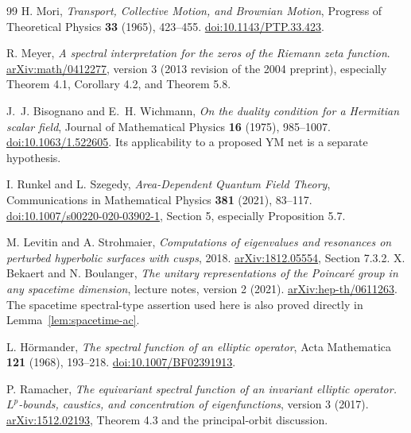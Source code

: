 \begin{thebibliography}{99}
H. Mori, \emph{Transport, Collective Motion, and Brownian
Motion}, Progress of Theoretical Physics \textbf{33}
(1965), 423--455.
\href{https://doi.org/10.1143/PTP.33.423}{doi:10.1143/PTP.33.423}.

R. Meyer, \emph{A spectral interpretation for the zeros of
the Riemann zeta function}.
\href{https://arxiv.org/abs/math/0412277}{arXiv:math/0412277},
version 3 (2013 revision of the 2004 preprint),
especially Theorem 4.1, Corollary 4.2, and Theorem 5.8.

J.~J. Bisognano and E.~H. Wichmann,
\emph{On the duality condition for a Hermitian scalar field},
Journal of Mathematical Physics \textbf{16} (1975), 985--1007.
\href{https://doi.org/10.1063/1.522605}{doi:10.1063/1.522605}.
Its applicability to a proposed YM net is a separate
hypothesis.

I. Runkel and L. Szegedy, \emph{Area-Dependent Quantum
Field Theory}, Communications in Mathematical Physics
\textbf{381} (2021), 83--117.
\href{https://doi.org/10.1007/s00220-020-03902-1}{doi:10.1007/s00220-020-03902-1},
Section 5, especially Proposition 5.7.

M. Levitin and A. Strohmaier,
\emph{Computations of eigenvalues and resonances on
perturbed hyperbolic surfaces with cusps}, 2018.
\href{https://arxiv.org/abs/1812.05554}{arXiv:1812.05554},
Section 7.3.2.
X. Bekaert and N. Boulanger,
\emph{The unitary representations of the Poincar\'e group
in any spacetime dimension}, lecture notes, version 2 (2021).
\href{https://arxiv.org/abs/hep-th/0611263}{arXiv:hep-th/0611263}.
The spacetime spectral-type assertion used here is also
proved directly in Lemma~\ref{lem:spacetime-ac}.

L. H\"ormander, \emph{The spectral function of an elliptic operator},
Acta Mathematica \textbf{121} (1968), 193--218.
\href{https://doi.org/10.1007/BF02391913}{doi:10.1007/BF02391913}.

P. Ramacher, \emph{The equivariant spectral function of an invariant
elliptic operator. $L^p$-bounds, caustics, and concentration of
eigenfunctions}, version 3 (2017).
\href{https://arxiv.org/abs/1512.02193}{arXiv:1512.02193},
Theorem 4.3 and the principal-orbit discussion.

\end{thebibliography}

